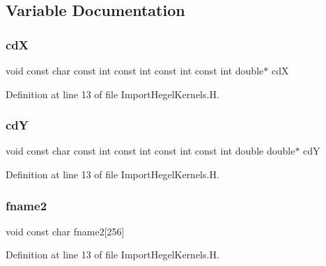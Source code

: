 \subsection{Variable Documentation}
\hypertarget{ImportHegelKernels_8H_a1045ab2a4235f932a263ec730b3827e0}{}\label{ImportHegelKernels_8H_a1045ab2a4235f932a263ec730b3827e0} 
\subsubsection{\texorpdfstring{cdX}{cdX}}
{\footnotesize\ttfamily void const char const int const int const int const int double$\ast$ cdX}



Definition at line 13 of file Import\+Hegel\+Kernels.\+H.

\hypertarget{ImportHegelKernels_8H_a5accbb83c789144f72abfbda6e477f88}{}\label{ImportHegelKernels_8H_a5accbb83c789144f72abfbda6e477f88} 
\subsubsection{\texorpdfstring{cdY}{cdY}}
{\footnotesize\ttfamily void const char const int const int const int const int double double$\ast$ cdY}



Definition at line 13 of file Import\+Hegel\+Kernels.\+H.

\hypertarget{ImportHegelKernels_8H_a9213fd75f34ddaa22b615f532aea59b0}{}\label{ImportHegelKernels_8H_a9213fd75f34ddaa22b615f532aea59b0} 
\subsubsection{\texorpdfstring{fname2}{fname2}}
{\footnotesize\ttfamily void const char fname2\mbox{[}256\mbox{]}}



Definition at line 13 of file Import\+Hegel\+Kernels.\+H.

\hypertarget{ImportHegelKernels_8H_a952a8708d7ea9d8cf34b900114b5b9c6}{}\label{ImportHegelKernels_8H_a952a8708d7ea9d8cf34b900114b5b9c6} 
